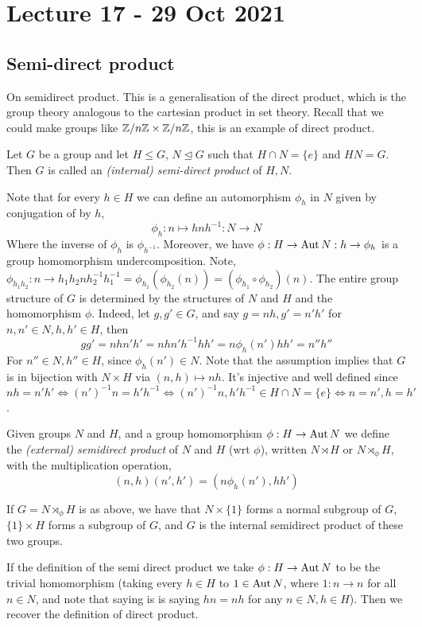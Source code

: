 \section{Lecture 17 - 29 Oct 2021}
\subsection{Semi-direct product}
On semidirect product. This is a generalisation of the direct product, which is the
group theory analogous to the cartesian product in set theory. Recall that we could make
groups like $\mathbb Z/n\mathbb Z \times \mathbb Z/n\mathbb Z$, this is an example of direct product. 
\begin{definition}
  Let $G$ be a group and let $H\leq G$, $N\trianglelefteq G$ such that $H\cap N = \{e\}$
  and $HN=G$. Then $G$ is called an \emph{(internal) semi-direct product} of $H,N$.
  \label{def:intSemidirProd}
\end{definition}
Note that for every $h\in H$ we can define an automorphism $\phi_h$ in $N$ given by
conjugation of by $h$,
\[\phi_h:n\mapsto hnh^{-1}:N\to N\]
Where the inverse of $\phi_h$ is $\phi_{h^{-1}}$. Moreover, we have $\phi:H\to \operatorname{Aut} N:h\to
\phi_h$ is a group homomorphism undercomposition. Note, $\phi_{h_1h_2}:n\to h_1h_2 n
h_2^{-1}h_{1}^{-1} =\phi_{h_1}(\phi_{h_2}(n))= (\phi_{h_1}\circ\phi_{h_2})(n)$. The entire
group structure of $G$ is determined by the structures of $N$ and $H$ and the homomorphism
$\phi$. Indeed, let $g,g'\in G$, and say $g=nh, g'=n'h'$ for $n,n'\in N, h,h'\in H$, then 
\[gg'=nhn'h'=nhn'h^{-1}hh'=n\phi_h(n')hh'=n''h''\]
For $n''\in N, h''\in H$, since $\phi_h(n')\in N$. Note that the assumption implies that
$G$ is in bijection with $N\times H$ via $(n,h)\mapsto nh$. It's injective and well
defined since $nh=n'h' \iff (n')^{-1}n=h'h^{-1} \iff (n')^{-1}n,h'h^{-1}\in H\cap N =
\{e\} \iff n=n',h=h'$.

\begin{definition}
  Given groups $N$ and $H$, and a group homomorphism $\phi:H\to \operatorname{Aut} N$ we define the
  \emph{(external) semidirect product} of $N$ and $H$ (wrt $\phi$), written $N\rtimes H$
  or $N\rtimes_{\phi} H$, with the multiplication operation,
  \[(n,h)(n',h')=(n\phi_h(n'), hh')\]
  \label{def:exSemidirProd}
\end{definition}
If $G=N\rtimes_{\phi} H$ is as above, we have that $N\times \{1\}$ forms a normal subgroup
of $G$, $\{1\}\times H$ forms a subgroup of $G$, and $G$ is the internal semidirect
product of these two groups.

\begin{example}
  If the definition of the semi direct product we take $\phi:H\to\operatorname{Aut} N$ to be the trivial
  homomorphism (taking every $h\in H$ to $1\in \operatorname{Aut} N$, where $1:n\to n$ for all $n\in
  N$, and note that saying is is saying $hn=nh$ for any $n\in N, h\in H$). Then we recover
  the definition of direct product.
  \label{ex:trivialHomDirecProd}
\end{example}

